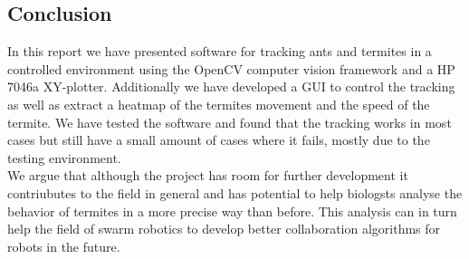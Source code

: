 
\subsection{Conclusion}

In this report we have presented software for tracking ants and termites in a controlled environment using the OpenCV computer vision framework and a HP 7046a XY-plotter. Additionally we have developed a GUI to control the tracking as well as extract a heatmap of the termites movement and the speed of the termite. We have tested the software and found that the tracking works in most cases but still have a small amount of cases where it fails, mostly due to the testing environment. \\

We argue that although the project has room for further development it contriubutes to the field in general and has potential to help biologsts analyse the behavior of termites in a more precise way than before. This analysis can in turn help the field of swarm robotics to develop better collaboration algorithms for robots in the future.
